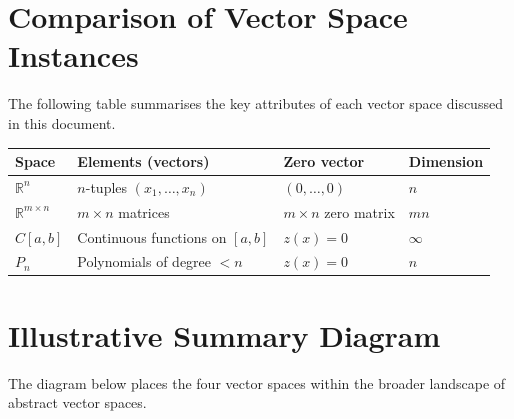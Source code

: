 \documentclass[12pt]{article}
\newcommand{\R}{\mathbb{R}}
\begin{document}
	
	\section{Comparison of Vector Space Instances}

	
	\noindent
	The following table summarises the key attributes of each vector space
	discussed in this document.
	
	\begin{center}
		\renewcommand{\arraystretch}{1.5}
		\begin{tabular}{>{\bfseries}p{2.8cm} p{3.2cm} p{3.2cm} p{3.5cm}}
			\toprule
			Space & Elements (vectors) & Zero vector & Dimension \\
			\midrule
			$\R^n$
			& $n$-tuples $(x_1,\ldots,x_n)$
			& $(0,\ldots,0)$
			& $n$ \\
			$\R^{m\times n}$
			& $m\times n$ matrices
			& $m\times n$ zero matrix
			& $mn$ \\
			$C[a,b]$
			& Continuous functions on $[a,b]$
			& $z(x)=0$
			& $\infty$ \\
			$P_n$
			& Polynomials of degree $<n$
			& $z(x)=0$
			& $n$ \\
			\bottomrule
		\end{tabular}
	\end{center}
	

	\section{Illustrative Summary Diagram}

	
	\noindent
	The diagram below places the four vector spaces within the broader landscape
	of abstract vector spaces.
	
\end{document}

